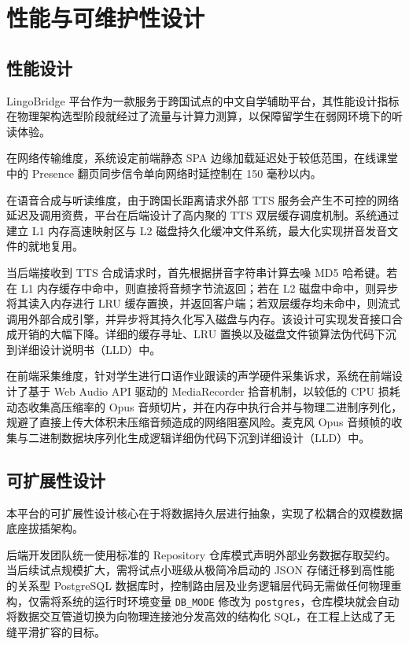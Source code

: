 \chapter{性能与可维护性设计}

\section{性能设计}
LingoBridge 平台作为一款服务于跨国试点的中文自学辅助平台，其性能设计指标在物理架构选型阶段就经过了流量与计算力测算，以保障留学生在弱网环境下的听读体验。

在网络传输维度，系统设定前端静态 SPA 边缘加载延迟处于较低范围，在线课堂中的 Presence 翻页同步信令单向网络时延控制在 150 毫秒以内。

在语音合成与听读维度，由于跨国长距离请求外部 TTS 服务会产生不可控的网络延迟及调用资费，平台在后端设计了高内聚的 TTS 双层缓存调度机制。系统通过建立 L1 内存高速映射区与 L2 磁盘持久化缓冲文件系统，最大化实现拼音发音文件的就地复用。

当后端接收到 TTS 合成请求时，首先根据拼音字符串计算去噪 MD5 哈希键。若在 L1 内存缓存中命中，则直接将音频字节流返回；若在 L2 磁盘中命中，则异步将其读入内存进行 LRU 缓存置换，并返回客户端；若双层缓存均未命中，则流式调用外部合成引擎，并异步将其持久化写入磁盘与内存。该设计可实现发音接口合成开销的大幅下降。详细的缓存寻址、LRU 置换以及磁盘文件锁算法伪代码下沉到详细设计说明书（LLD）中。

在前端采集维度，针对学生进行口语作业跟读的声学硬件采集诉求，系统在前端设计了基于 Web Audio API 驱动的 MediaRecorder 拾音机制，以较低的 CPU 损耗动态收集高压缩率的 Opus 音频切片，并在内存中执行合并与物理二进制序列化，规避了直接上传大体积未压缩音频造成的网络阻塞风险。麦克风 Opus 音频帧的收集与二进制数据块序列化生成逻辑详细伪代码下沉到详细设计（LLD）中。

\section{可扩展性设计}
本平台的可扩展性设计核心在于将数据持久层进行抽象，实现了松耦合的双模数据底座拔插架构。

后端开发团队统一使用标准的 Repository 仓库模式声明外部业务数据存取契约。当后续试点规模扩大，需将试点小班级从极简冷启动的 JSON 存储迁移到高性能的关系型 PostgreSQL 数据库时，控制路由层及业务逻辑层代码无需做任何物理重构，仅需将系统的运行时环境变量 \texttt{DB\_MODE} 修改为 \texttt{postgres}，仓库模块就会自动将数据交互管道切换为向物理连接池分发高效的结构化 SQL，在工程上达成了无缝平滑扩容的目标。

